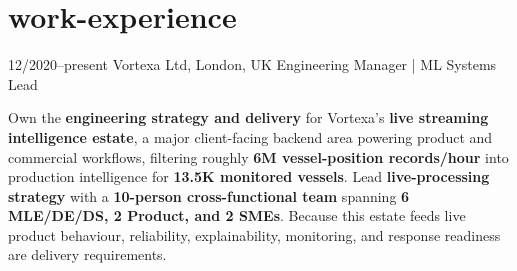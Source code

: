 \documentclass[]{../../../../friggeri-cv}
\begin{document}
\section{work-experience}
\begin{entrylist}
	\entry
	{12/2020–present}
	{Vortexa Ltd, London, UK}
		{Engineering Manager | ML Systems Lead}
	{
    	{\small
	    \setlength{\parindent}{0pt}
	    \setlength{\leftskip}{0pt}
							    Own the \textbf{engineering strategy and delivery} for Vortexa's \textbf{live streaming intelligence estate}, a major client-facing backend area powering product and commercial workflows, filtering roughly \textbf{6M vessel-position records/hour} into production intelligence for \textbf{13.5K monitored vessels}. Lead \textbf{live-processing strategy} with a \textbf{10-person cross-functional team} spanning \textbf{6 MLE/DE/DS, 2 Product, and 2 SMEs}. Because this estate feeds live product behaviour, reliability, explainability, monitoring, and response readiness are delivery requirements.
	    
}}
\end{entrylist}
\end{document}
